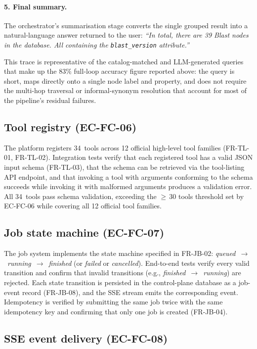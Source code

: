 \documentclass[a4paper,noexaminfo]{sapthesis}
\newcommand{\CategoryCount}{12}
\begin{document}
\paragraph{5. Final summary.}
The orchestrator's summarisation stage converts the single grouped result
into a natural-language answer returned to the user:
\emph{``In total, there are 39 Blast nodes in the database.  All
containing the \texttt{blast\_version} attribute.''}

This trace is representative of the catalog-matched and LLM-generated
queries that make up the 83\% full-loop accuracy figure reported above:
the query is short, maps directly onto a single node label and property,
and does not require the multi-hop traversal or informal-synonym
resolution that account for most of the pipeline's residual failures.

\subsection{Tool registry (EC-FC-06)}

The platform registers 34~tools across \CategoryCount{} official
high-level tool families (FR-TL-01, FR-TL-02).  Integration tests verify that each registered
tool has a valid JSON input schema (FR-TL-03), that the schema can be
retrieved via the tool-listing API endpoint, and that invoking a tool
with arguments conforming to the schema succeeds while invoking it with
malformed arguments produces a validation error.  All 34~tools pass
schema validation, exceeding the $\geq$\,30 tools threshold set by
EC-FC-06 while covering all 12 official tool families.

\subsection{Job state machine (EC-FC-07)}

The job system implements the state machine specified in FR-JB-02:
\emph{queued}~$\to$~\emph{running}~$\to$~\emph{finished} (or
\emph{failed} or \emph{cancelled}).  End-to-end tests verify every valid
transition and confirm that invalid transitions (e.g.,
\emph{finished}~$\to$~\emph{running}) are rejected.  Each state
transition is persisted in the control-plane database as a job-event
record (FR-JB-08), and the SSE stream emits the corresponding event.
Idempotency is verified by submitting the same job twice with the same
idempotency key and confirming that only one job is created (FR-JB-04).

\subsection{SSE event delivery (EC-FC-08)}
\end{document}
